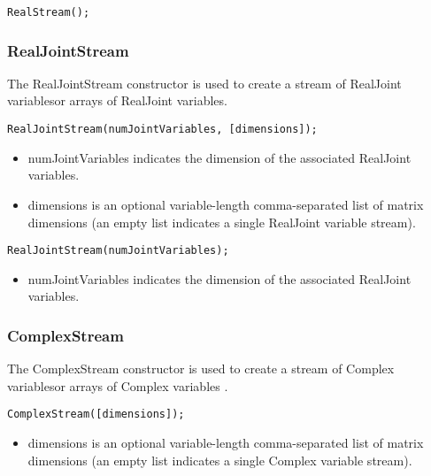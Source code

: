 \ifjava
\begin{lstlisting}
RealStream();
\end{lstlisting}
\fi

\subsubsection{RealJointStream}


The RealJointStream constructor is used to create a stream of RealJoint variables\ifmatlab or arrays of RealJoint variables\fi.

\ifmatlab
\begin{lstlisting}
RealJointStream(numJointVariables, [dimensions]);
\end{lstlisting}

\begin{itemize}
\item numJointVariables indicates the dimension of the associated RealJoint variables.
\item dimensions is an optional variable-length comma-separated list of matrix dimensions (an empty list indicates a single RealJoint variable stream).
\end{itemize}
\fi

\ifjava
\begin{lstlisting}
RealJointStream(numJointVariables);
\end{lstlisting}

\begin{itemize}
\item numJointVariables indicates the dimension of the associated RealJoint variables.
\end{itemize}
\fi


\subsubsection{ComplexStream}


The ComplexStream constructor is used to create a stream of Complex variables\ifmatlab or arrays of Complex variables \fi.

\ifmatlab
\begin{lstlisting}
ComplexStream([dimensions]);
\end{lstlisting}

\begin{itemize}
\item dimensions is an optional variable-length comma-separated list of matrix dimensions (an empty list indicates a single Complex variable stream).
\end{itemize}
\fi


